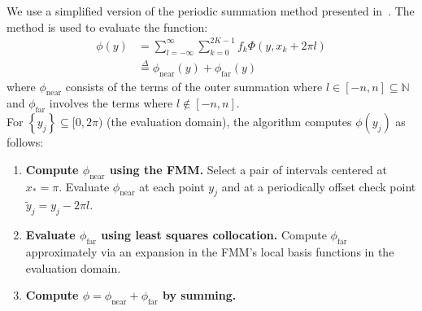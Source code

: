 \documentclass[a0paper, landscape, final]{baposter}
\newcommand{\set}[1]{\left\{#1\right\}}
\newcommand{\phinear}{\phi_{\operatorname{near}}}
\newcommand{\phifar}{\phi_{\operatorname{far}}}
\begin{document}
\begin{poster}
{    We use a simplified version of the periodic summation method
    presented in~\cite{gumerov-periodic-sums}. The method is used to evaluate the function:
    \begin{align*}
      \phi(y) &= \sum_{l=-\infty}^\infty \sum_{k=0}^{2K-1} f_k \Phi(y, x_k + 2 \pi l) \\
      &\overset{\Delta}{=} \phinear(y) + \phifar(y)
    \end{align*}
    where $\phinear$ consists of the terms of the outer summation
    where $l \in [-n, n] \subseteq \mathbb{N}$ and $\phifar$ involves
    the terms where $l \notin [-n, n]$. \\

    For $\set{y_j} \subseteq [0, 2\pi)$ (the evaluation domain), the
    algorithm computes $\phi(y_j)$ as follows: 
    { \small
      \begin{enumerate}
      \item \textbf{Compute $\phinear$ using the FMM.} Select a pair
        of intervals centered at $x_* = \pi$. Evaluate $\phinear$ at
        each point $y_j$ and at a periodically offset check point
        $\tilde{y}_j = y_j - 2\pi l$.
      \item \textbf{Evaluate $\phifar$ using least squares collocation.}
        Compute $\phifar$ approximately via an expansion in the FMM's
        local basis functions in the evaluation domain.
      \item \textbf{Compute $\phi = \phinear + \phifar$ by summing.}
      \end{enumerate}
    }




    \begin{center} 
      \vspace{0.2cm}
\end{center}}
\end{poster}
\end{document}
